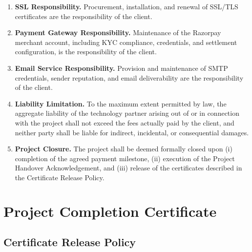 \documentclass[11pt,a4paper]{article}
\begin{document}
\begin{enumerate}[leftmargin=*, itemsep=8pt]
    \item \textbf{SSL Responsibility.} Procurement, installation, and renewal
    of SSL/TLS certificates are the responsibility of the client.

    \item \textbf{Payment Gateway Responsibility.} Maintenance of the
    Razorpay merchant account, including KYC compliance, credentials, and
    settlement configuration, is the responsibility of the client.

    \item \textbf{Email Service Responsibility.} Provision and maintenance of
    SMTP credentials, sender reputation, and email deliverability are the
    responsibility of the client.

    \item \textbf{Liability Limitation.} To the maximum extent permitted by
    law, the aggregate liability of the technology partner arising out of or
    in connection with the project shall not exceed the fees actually paid by
    the client, and neither party shall be liable for indirect, incidental,
    or consequential damages.

    \item \textbf{Project Closure.} The project shall be deemed formally
    closed upon (i) completion of the agreed payment milestone,
    (ii) execution of the Project Handover Acknowledgement, and
    (iii) release of the certificates described in the Certificate Release
    Policy.

\end{enumerate}

\newpage
\section{Project Completion Certificate}

\subsection*{Certificate Release Policy}
\end{document}
